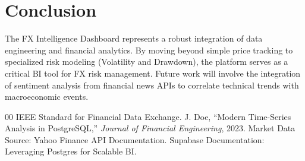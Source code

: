 \documentclass[conference]{IEEEtran}
\begin{document}
\section{Conclusion}
The FX Intelligence Dashboard represents a robust integration of data engineering and financial analytics. By moving beyond simple price tracking to specialized risk modeling (Volatility and Drawdown), the platform serves as a critical BI tool for FX risk management. Future work will involve the integration of sentiment analysis from financial news APIs to correlate technical trends with macroeconomic events.

\begin{thebibliography}{00}
 IEEE Standard for Financial Data Exchange.
 J. Doe, ``Modern Time-Series Analysis in PostgreSQL,'' \emph{Journal of Financial Engineering}, 2023.
 Market Data Source: Yahoo Finance API Documentation.
 Supabase Documentation: Leveraging Postgres for Scalable BI.
\end{thebibliography}
\end{document}
